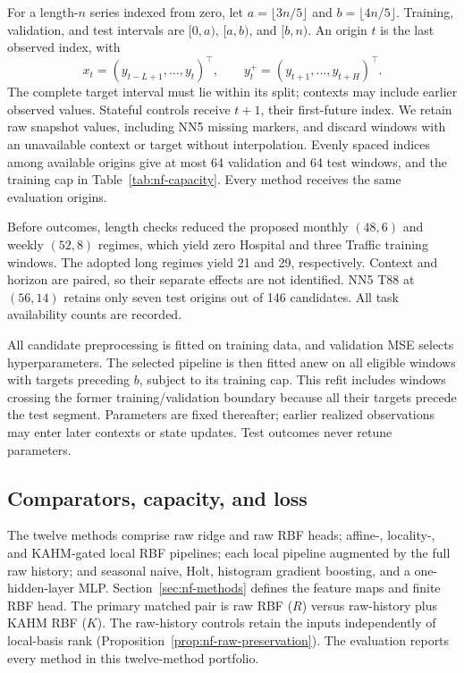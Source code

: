 For a length-$n$ series indexed from zero, let
$a=\lfloor3n/5\rfloor$ and $b=\lfloor4n/5\rfloor$.  Training, validation, and
test intervals are $[0,a)$, $[a,b)$, and $[b,n)$.  An origin $t$ is the last
observed index, with
\begin{equation}
 x_t=(y_{t-L+1},\ldots,y_t)^\top,\qquad
 y_t^+=(y_{t+1},\ldots,y_{t+H})^\top.
 \label{eq:nf-forecast-window}
\end{equation}
The complete target interval must lie within its split; contexts may include
earlier observed values.  Stateful controls receive $t+1$, their first-future
index.  We retain raw snapshot values, including NN5 missing markers, and
discard windows with an unavailable context or target without interpolation.
Evenly spaced indices among available origins give at most 64 validation and
64 test windows, and the training cap in Table~\ref{tab:nf-capacity}.  Every
method receives the same evaluation origins.

Before outcomes, length checks reduced the proposed monthly $(48,6)$ and
weekly $(52,8)$ regimes, which yield zero Hospital and three Traffic training
windows.  The adopted long regimes yield 21 and 29, respectively.  Context
and horizon are paired, so their separate effects are not identified.
NN5 T88 at $(56,14)$ retains only seven test origins out of 146 candidates.
All task availability counts are recorded.

All candidate preprocessing is fitted on training data, and validation MSE
selects hyperparameters.  The selected pipeline is then fitted anew on all
eligible windows with targets preceding $b$, subject to its training cap.
This refit includes windows crossing the former training/validation
boundary because all their targets precede the test segment.  Parameters are fixed thereafter; earlier realized observations may
enter later contexts or state updates.  Test outcomes never retune parameters.

\subsection{Comparators, capacity, and loss}
\label{sec:nf-comparators}

The twelve methods comprise raw ridge and raw RBF heads; affine-, locality-,
and KAHM-gated local RBF pipelines; each local pipeline augmented by the full
raw history; and seasonal naive, Holt, histogram gradient boosting, and a
one-hidden-layer MLP.  Section~\ref{sec:nf-methods} defines the feature maps and
finite RBF head.  The primary matched pair is raw RBF ($R$) versus raw-history
plus KAHM RBF ($K$).  The raw-history controls retain the inputs independently
of local-basis rank (Proposition~\ref{prop:nf-raw-preservation}).  The evaluation reports every method in this twelve-method portfolio.

